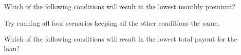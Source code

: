 \documentclass{ximera}
\begin{document}
\begin{question}
Which of the following conditions will result in the lowest monthly premium?
\begin{solution}
\begin{multiple-choice}
\end{multiple-choice}
\begin{hint}
Try running all four scenarios keeping all the other conditions the same.
\end{hint}
\end{solution}
\end{question}

\begin{question}
Which of the following conditions will result in the lowest total payout for the loan?
\begin{solution}
\begin{multiple-choice}
\end{multiple-choice}
\end{solution}
\end{question}
\end{document}
